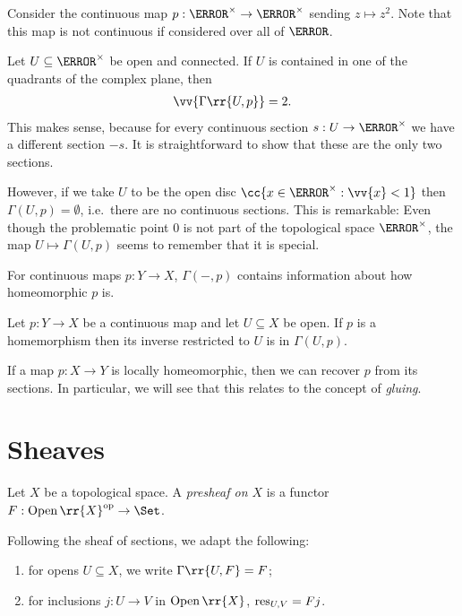 \documentclass{article}
\begin{document}
\begin{example}
  \label{ex:complexroot}
  Consider the continuous map $p : \C^\times \to \C^\times$ sending
  $z \mapsto z^2$. Note that this map is not continuous if considered over all of
  $\C$.

  Let $U\subseteq\C^\times$ be open and connected. If $U$ is
  contained in one of the quadrants of the complex plane, then
  \begin{align*}
    \vv{\Gamma\rr{U, p}} = 2.
  \end{align*}
  This makes sense, because for every continuous section $s:U\to\C^\times$ we have
  a different section $-s$. It is straightforward to show that these are the only
  two sections.

  However, if we take $U$ to be the open disc $\cc{x \in \C^\times : \vv{x}<1}$
  then $\Gamma(U,p)=\emptyset$, i.e.~there are no continuous sections. This is
  remarkable: Even though the problematic point $0$ is not part of the
  topological space $\C^\times$, the map $U\mapsto\Gamma(U,p)$ seems to
  remember that it is special.
\end{example}

For continuous maps $p : Y \to X$, $\Gamma(-,p)$ contains information
about how homeomorphic $p$ is.

\begin{proposition}
  Let $p : Y \to X$ be a continuous map and let $U\subseteq X$ be open.
  If $p$ is a homemorphism then its inverse restricted to $U$
  is in $\Gamma(U,p)$.
\end{proposition}

\begin{remark}
  If a map $p : X \to Y$ is locally homeomorphic, then we can recover
  $p$ from its sections. In particular, we will see that this relates to the
  concept of \emph{gluing}.
\end{remark}

\section{Sheaves}\label{sec:sheaves}

\begin{definition}
  Let $X$ be a topological space. A \emph{presheaf on $X$} is a functor
  $F:\Open\rr{X}^{\text{op}}\to\Set$.
\end{definition}

\begin{notation}
  Following the sheaf of sections, we adapt the following:
  \begin{enumerate}
    \item for opens $U\subseteq X$, we write $\Gamma\rr{U,F}=F$;
    \item for inclusions $j:U\to V$ in $\Open\rr{X}$, $\operatorname{res}_{U,V}=Fj$.
  \end{enumerate}
\end{notation}
\end{document}
